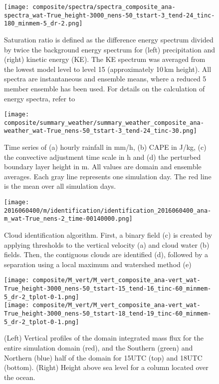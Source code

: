 \documentclass[a4paper, 12pt]{article}
\begin{document}
\begin{figure}[h!]
\noindent \centering
\texttt{[image: composite/spectra/spectra\_composite\_ana-spectra\_wat-True\_height-3000\_nens-50\_tstart-3\_tend-24\_tinc-180\_minmem-5\_dr-2.png]}\\
\caption{Saturation ratio is defined as the difference energy spectrum divided by twice the background energy spectrum for (left) precipitation and (right) kinetic energy (KE). The KE spectrum was averaged from the lowest model level to level 15 (approximately 10\,km height). All spectra are instantaneous and ensemble means, where a reduced 5 member ensemble has been used. For details on the calculation of energy spectra, refer to \cite{Selz2015b}} \label{fig:spectra}
\end{figure}

\begin{figure}[h!]
\noindent \centering
\texttt{[image: composite/summary\_weather/summary\_weather\_composite\_ana-weather\_wat-True\_nens-50\_tstart-3\_tend-24\_tinc-30.png]}\\
\caption{Time series of (a) hourly rainfall in mm/h, (b) CAPE in J/kg, (c) the convective adjustment time scale in h and (d) the perturbed boundary layer height in m. All values are domain and ensemble averages. Each gray line represents one simulation day. The red line is the mean over all simulation days.} \label{fig:summary_weather}
\end{figure}

\begin{figure}[ht]
\noindent \centering
\texttt{[image: 2016060400/m/identification/identification\_2016060400\_ana-m\_wat-True\_nens-2\_time-00140000.png]}\\
\caption{Cloud identification algorithm. First, a binary field (c) is created by applying thresholds to the vertical velocity (a) and cloud water (b) fields. Then, the contiguous clouds are identified (d), followed by a separation using a local maximum and watershed method (e)} \label{fig:Fig4}
\end{figure}

\begin{figure}[ht]
\noindent \centering
\texttt{[image: composite/M\_vert/M\_vert\_composite\_ana-vert\_wat-True\_height-3000\_nens-50\_tstart-15\_tend-16\_tinc-60\_minmem-5\_dr-2\_tplot-0-1.png]}\\
\texttt{[image: composite/M\_vert/M\_vert\_composite\_ana-vert\_wat-True\_height-3000\_nens-50\_tstart-18\_tend-19\_tinc-60\_minmem-5\_dr-2\_tplot-0-1.png]}\\
\caption{(Left) Vertical profiles of the domain integrated mass flux for the entire simulation domain (red), and the Southern (green) and Northern (blue) half of the domain for 15UTC (top) and 18UTC (bottom). (Right) Height above sea level for a column located over the ocean.} \label{fig:Fig4}
\end{figure}
\end{document}
